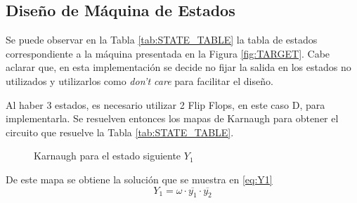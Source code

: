 \subsection{Dise\~no de M\'aquina de Estados}
Se puede observar en la Tabla \ref{tab:STATE_TABLE} la tabla de estados correspondiente a la m\'aquina presentada en la Figura \ref{fig:TARGET}. Cabe aclarar que, en esta implementaci\'on se decide no fijar la salida en los estados no utilizados y utilizarlos como \textit{don't care} para facilitar el dise\~no.
\begin{table}[H]
    \centering
    \caption{Tabla de estados de la máquina de Moore}
    \label{tab:STATE_TABLE}
\end{table}
Al haber 3 estados, es necesario utilizar 2 Flip Flops, en este caso D, para implementarla. 
Se resuelven entonces los mapas de Karnaugh para obtener el circuito que resuelve la Tabla \ref{tab:STATE_TABLE}.
\begin{figure}[H]
    \centering    
        \begin{Karnaughvuit}
        \end{Karnaughvuit}
        \caption{Karnaugh para el estado siguiente $Y_1$}    
\end{figure}     
De este mapa se obtiene la soluci\'on que se muestra en \ref{eq:Y1}     
\begin{equation}
    Y_1 = \omega \cdot \overline{y_1}\cdot \overline{y_2}
    \label{eq:Y1}
\end{equation}      

